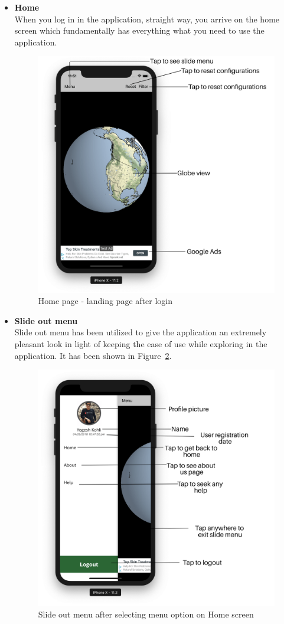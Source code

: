 \begin{itemize}
    
    \item \textbf{Home} \\
    When you log in in the application, straight way, you arrive on the home screen which fundamentally has everything what you need to use the application.
    
    \begin{figure}[H]
            \centering
            \includegraphics[width=0.5\linewidth]{figures/ch2/home.png}
            \caption{\label{fig:home_screen} Home page - landing page after login}
    \end{figure}
    

    \item \textbf{Slide out menu} \\
    Slide out menu has been utilized to give the application an extremely pleasant look in light of keeping the ease of use while exploring in the application. It has been shown in Figure~\ref{fig:side_menu}.
    
     \begin{figure}[H]
            \centering
            \includegraphics[width=0.50\linewidth]{figures/ch2/side_menu.png}
            \caption{\label{fig:side_menu} Slide out menu after selecting menu option on Home screen}
    \end{figure}
    

\end{itemize}
